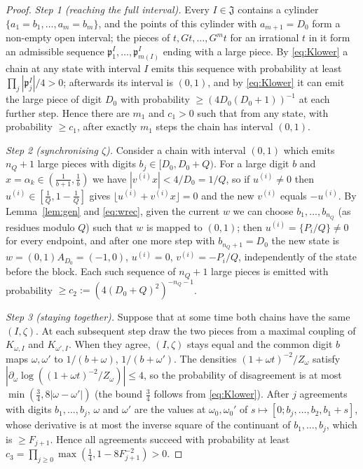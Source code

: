\documentclass[11pt]{amsart}
\theoremstyle{definition}
\numberwithin{equation}{section}
\newcommand{\fp}{\mathfrak{p}}
\newcommand{\fr}[1]{\{#1\}}
\begin{document}
\begin{proof}
\emph{Step 1 (reaching the full interval).} Every $I\in\mathfrak J$ contains a cylinder $\{a_1=b_1,\dots,a_m=b_m\}$, and the points of this cylinder
with $a_{m+1}=D_0$ form a non-empty open interval; the pieces of $t,Gt,\dots,G^mt$ for an irrational $t$ in it form an admissible sequence
$\fp^I_1,\dots,\fp^I_{m(I)}$ ending with a large piece. By \eqref{eq:Klower} a chain at any state with interval $I$ emits this sequence with probability
at least $\prod_j|\fp^I_j|/4>0$; afterwards its interval is $(0,1)$, and by \eqref{eq:Klower} it can emit the large piece of digit $D_0$ with
probability $\ge(4D_0(D_0+1))^{-1}$ at each further step. Hence there are $m_1$ and $c_1>0$ such that from any state, with probability
$\ge c_1$, after exactly $m_1$ steps the chain has interval $(0,1)$.

\emph{Step 2 (synchronising $\zeta$).} Consider a chain with interval $(0,1)$ which emits $n_Q+1$ large pieces with digits $b_j\in[D_0,D_0+Q)$. For a
large digit $b$ and $x=\alpha_k\in(\frac1{b+1},\frac1b)$ we have $|v^{(i)}x|<4/D_0=1/Q$, so if $u^{(i)}\ne0$ then $u^{(i)}\in[\frac1Q,1-\frac1Q]$ gives
$\lfloor u^{(i)}+v^{(i)}x\rfloor=0$ and the new $v^{(i)}$ equals $-u^{(i)}$. By Lemma~\ref{lem:gen} and \eqref{eq:wrec}, given the current $w$ we can
choose $b_1,\dots,b_{n_Q}$ (as residues modulo $Q$) such that $w$ is mapped to $(0,1)$; then $u^{(i)}=\fr{P_i/Q}\ne0$ for every endpoint, and after one
more step with $b_{n_Q+1}=D_0$ the new state is $w=(0,1)A_{D_0}=(-1,0)$, $u^{(i)}=0$, $v^{(i)}=-P_i/Q$, independently of the state before the block.
Each such sequence of $n_Q+1$ large pieces is emitted with probability $\ge c_2:=(4(D_0+Q)^2)^{-n_Q-1}$.

\emph{Step 3 (staying together).} Suppose that at some time both chains have the same $(I,\zeta)$. At each subsequent step draw the two pieces from a
maximal coupling of $K_{\omega,I}$ and $K_{\omega',I}$. When they agree, $(I,\zeta)$ stays equal and the common digit $b$ maps $\omega,\omega'$ to
$1/(b+\omega)$, $1/(b+\omega')$. The densities $(1+\omega t)^{-2}/Z_\omega$ satisfy $|\partial_\omega\log((1+\omega t)^{-2}/Z_\omega)|\le4$, so the probability of
disagreement is at most $\min(\frac34,8|\omega-\omega'|)$ (the bound $\frac34$ follows from \eqref{eq:Klower}). After $j$ agreements with digits
$b_1,\dots,b_j$, $\omega$ and $\omega'$ are the values at $\omega_0,\omega_0'$ of $s\mapsto[0;b_j,\dots,b_2,b_1+s]$, whose derivative is at most the inverse
square of the continuant of $b_1,\dots,b_j$, which is $\ge F_{j+1}$. Hence all agreements succeed with probability at least
$c_3=\prod_{j\ge0}\max(\frac14,1-8F_{j+1}^{-2})>0$.


\end{proof}
\end{document}
